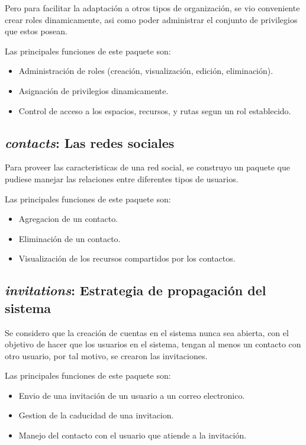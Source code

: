 Pero para facilitar la adaptación a otros tipos de organización, se vio
conveniente crear roles dinamicamente, asi como poder administrar el conjunto
de privilegios que estos posean.

Las principales funciones de este paquete son:

\begin{itemize}
\item Administración de roles (creación, visualización, edición, eliminación).
\item Asignación de privilegios dinamicamente.
\item Control de acceso a los espacios, recursos, y rutas segun un rol
establecido.
\end{itemize}

\subsection{\emph{contacts}: Las redes sociales}
Para proveer las caracteristicas de una red social, se construyo un paquete que
pudiese manejar las relaciones entre diferentes tipos de usuarios.

Las principales funciones de este paquete son:

\begin{itemize}
\item Agregacion de un contacto.
\item Eliminación de un contacto.
\item Visualización de los recursos compartidos por los contactos.
\end{itemize}

\subsection{\emph{invitations}: Estrategia de propagación del sistema}
Se considero que la creación de cuentas en el sistema nunca sea abierta, con el
objetivo de hacer que los usuarios en el sistema, tengan al menos un contacto
con otro usuario, por tal motivo, se crearon las invitaciones.

Las principales funciones de este paquete son:

\begin{itemize}
\item Envio de una invitación de un usuario a un correo electronico.
\item Gestion de la caducidad de una invitacion.
\item Manejo del contacto con el usuario que atiende a la invitación.
\end{itemize}

